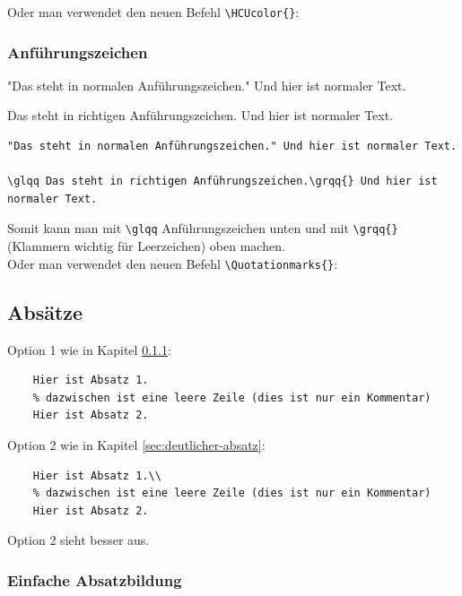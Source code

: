 Oder man verwendet den neuen Befehl \verb|\HCUcolor{}|:



\subsubsection{Anführungszeichen}

"Das steht in normalen Anführungszeichen." Und hier ist normaler Text.

\glqq Das steht in richtigen Anführungszeichen.\grqq{} Und hier ist
normaler Text.

\begin{verbatim}
"Das steht in normalen Anführungszeichen." Und hier ist normaler Text.

\glqq Das steht in richtigen Anführungszeichen.\grqq{} Und hier ist
normaler Text.
\end{verbatim}

Somit kann man mit \verb|\glqq| Anführungszeichen unten und mit \verb|\grqq{}| (Klammern wichtig für Leerzeichen) oben machen.\\

Oder man verwendet den neuen Befehl \verb|\Quotationmarks{}|:



\subsection{Absätze}

Option 1 wie in Kapitel \ref{sec:einfacher-absatz}:

\begin{verbatim}
    Hier ist Absatz 1.
    % dazwischen ist eine leere Zeile (dies ist nur ein Kommentar)
    Hier ist Absatz 2.
\end{verbatim}

Option 2 wie in Kapitel \ref{sec:deutlicher-absatz}:

\begin{verbatim}
    Hier ist Absatz 1.\\
    % dazwischen ist eine leere Zeile (dies ist nur ein Kommentar)
    Hier ist Absatz 2.
\end{verbatim}

Option 2 sieht besser aus.


\subsubsection{Einfache Absatzbildung} \label{sec:einfacher-absatz}

